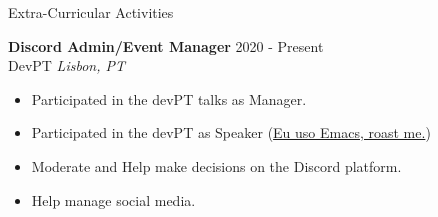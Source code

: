 \documentclass{resume} %
\begin{document}





\begin{rSection}{Extra-Curricular Activities}

  \textbf{Discord Admin/Event Manager} \hfill 2020 - Present \\
  DevPT \hfill \textit{Lisbon, PT}
  \begin{itemize}
    \itemsep -3pt {} 
  \item Participated in the devPT talks as Manager.
  \item Participated in the devPT as Speaker (\href{https://www.youtube.com/watch?v=p7FrTaukioI&t=2693s}{Eu uso Emacs, roast me.})
  \item Moderate and Help make decisions on the Discord platform.
  \item Help manage social media.
  \end{itemize}

\end{rSection}
\end{document}
